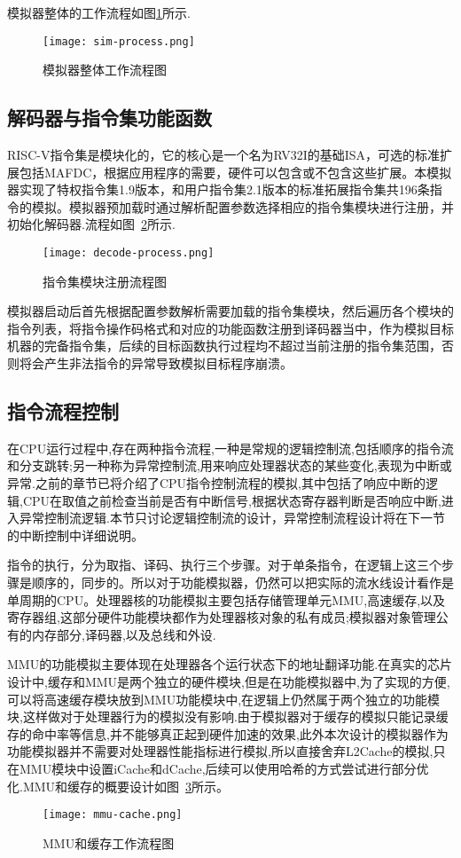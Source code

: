 模拟器整体的工作流程如图\ref{fig:work-frame}所示.
\begin{figure}[H]
  \centering
  \texttt{[image: sim-process.png]}
  \caption{模拟器整体工作流程图}
  \label{fig:work-frame}
\end{figure}


\subsection{解码器与指令集功能函数}
RISC-V指令集是模块化的，它的核心是一个名为RV32I的基础ISA，可选的标准扩展包括MAFDC，根据应用程序的需要，硬件可以包含或不包含这些扩展。本模拟器实现了特权指令集1.9版本，和用户指令集2.1版本的标准拓展指令集共196条指令的模拟。模拟器预加载时通过解析配置参数选择相应的指令集模块进行注册，并初始化解码器.流程如图~\ref{fig:decode-process}所示.
\begin{figure}[H]
  \centering
  \texttt{[image: decode-process.png]}
  \caption{指令集模块注册流程图}
  \label{fig:decode-process}
\end{figure}


模拟器启动后首先根据配置参数解析需要加载的指令集模块，然后遍历各个模块的指令列表，将指令操作码格式和对应的功能函数注册到译码器当中，作为模拟目标机器的完备指令集，后续的目标函数执行过程均不超过当前注册的指令集范围，否则将会产生非法指令的异常导致模拟目标程序崩溃。

\subsection{指令流程控制}
在CPU运行过程中,存在两种指令流程,一种是常规的逻辑控制流,包括顺序的指令流和分支跳转;另一种称为异常控制流,用来响应处理器状态的某些变化,表现为中断或异常.之前的章节已将介绍了CPU指令控制流程的模拟,其中包括了响应中断的逻辑,CPU在取值之前检查当前是否有中断信号,根据状态寄存器判断是否响应中断,进入异常控制流逻辑.本节只讨论逻辑控制流的设计，异常控制流程设计将在下一节的中断控制中详细说明。


指令的执行，分为取指、译码、执行三个步骤。对于单条指令，在逻辑上这三个步骤是顺序的，同步的。所以对于功能模拟器，仍然可以把实际的流水线设计看作是单周期的CPU。处理器核的功能模拟主要包括存储管理单元MMU,高速缓存,以及寄存器组,这部分硬件功能模块都作为处理器核对象的私有成员;模拟器对象管理公有的内存部分,译码器,以及总线和外设.


MMU的功能模拟主要体现在处理器各个运行状态下的地址翻译功能.在真实的芯片设计中,缓存和MMU是两个独立的硬件模块,但是在功能模拟器中,为了实现的方便,可以将高速缓存模块放到MMU功能模块中,在逻辑上仍然属于两个独立的功能模块,这样做对于处理器行为的模拟没有影响.由于模拟器对于缓存的模拟只能记录缓存的命中率等信息,并不能够真正起到硬件加速的效果,此外本次设计的模拟器作为功能模拟器并不需要对处理器性能指标进行模拟,所以直接舍弃L2Cache的模拟,只在MMU模块中设置iCache和dCache,后续可以使用哈希的方式尝试进行部分优化.MMU和缓存的概要设计如图~\ref{fig:mmu-process}所示。
\begin{figure}[H]
  \centering
  \texttt{[image: mmu-cache.png]}
  \caption{MMU和缓存工作流程图}
  \label{fig:mmu-process}
\end{figure}


